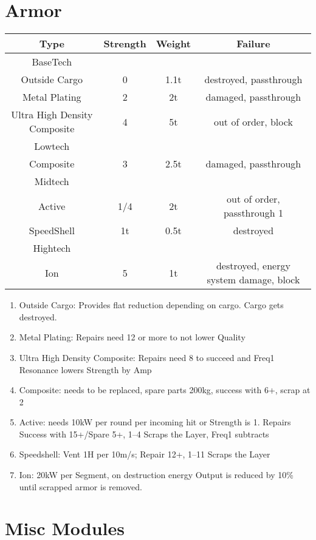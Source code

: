 \section{Armor}\label{sec:armor}
\begin{tabular}{c|ccc}
    Type & Strength & Weight & Failure\\
    \hline BaseTech&&&\\
    Outside Cargo & 0 & 1.1t & destroyed, passthrough\\
    Metal Plating & 2 & 2t & damaged, passthrough\\
    Ultra High Density Composite & 4 & 5t & out of order, block\\
    \hline Lowtech &&&\\
    Composite & 3 & 2.5t & damaged, passthrough \\
    \hline Midtech &&&\\
    Active & 1/4 & 2t & out of order, passthrough 1\\
    SpeedShell & 1t & 0.5t & destroyed \\
    \hline Hightech &&&\\
    Ion & 5 & 1t & destroyed, energy system damage, block \\
\end{tabular}

\begin{enumerate}[label = - ]
    \item Outside Cargo: Provides flat reduction depending on cargo.
    Cargo gets destroyed.
    \item Metal Plating: Repairs need 12 or more to not lower Quality
    \item Ultra High Density Composite: Repairs need 8 to succeed and Freq1 Resonance lowers Strength by Amp
    \item Composite: needs to be replaced, spare parts 200kg, success with 6+, scrap at 2
    \item Active: needs 10kW per round per incoming hit or Strength is 1.
    Repairs Success with 15+/Spare 5+, 1--4 Scraps the Layer, Freq1 subtracts
    \item Speedshell: Vent 1H per 10m/s;
    Repair 12+, 1--11 Scraps the Layer
    \item Ion: 20kW per Segment, on destruction energy Output is reduced by 10\% until scrapped armor is removed.
\end{enumerate}

\section{Misc Modules}\label{sec:miscmodules}
\par
